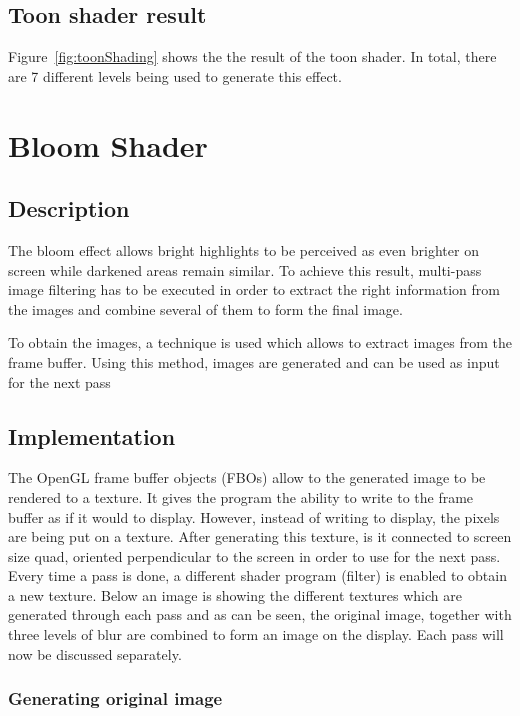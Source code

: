 \documentclass[a4paper,12pt]{article}
\begin{document}
\subsection{Toon shader result}
\label{sec:ToonShaderResult}

Figure~\ref{fig:toonShading} shows the the result of the toon shader. In total, there are 7 different levels being used to generate this effect.

\section{Bloom Shader}
\label{sec:BloomShader}

\subsection{Description}
\label{sec:DescriptionBloomShader}

The bloom effect allows bright highlights to be perceived as even brighter on screen while darkened areas remain similar. To achieve this result, multi-pass image filtering has to be executed in order to extract the right information from the images and combine several of them to form the final image.

To obtain the images, a technique is used which allows to extract images from the frame buffer. Using this method, images are generated and can be used as input for the next pass


\subsection{Implementation}
\label{sec:ImplementationBloomShader}

The OpenGL frame buffer objects (FBOs) allow to the generated image to be rendered to a texture. It gives the program the ability to write to the frame buffer as if it would to display. However, instead of writing to display, the pixels are being put on a texture. After generating this texture, is it connected to screen size quad, oriented perpendicular to the screen in order to use for the next pass. Every time a pass is done, a different shader program (filter) is enabled to obtain a new texture. Below an image is showing the different textures which are generated through each pass and as can be seen, the original image, together with three levels of blur are combined to form an image on the display. Each pass will now be discussed separately.

\subsubsection{Generating original image}
\label{sec:GeneratingOriginalImage}
\end{document}
